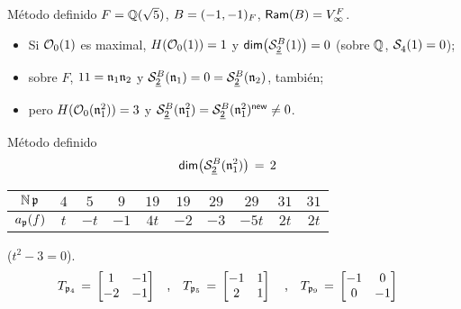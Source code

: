 \theoremstyle{remark}


\begin{frame}{M\'{e}todo definido}
	$F=\bb Q(\sqrt 5)$, $B=\quatalg[F]{-1,-1}$,
	$\Ram(B)=\lugares[\infty]{F}$.
	\begin{itemize}
		\item Si $\cal O_0(1)$ es maximal, $H(\cal O_0(1))=1$ y
			$\dim{\spitzH[B]2{1}}=0$ (sobre $\bb Q$,
			$\spitz4{1}=0$);
		\item sobre $F$, $11=\frak n_1\frak n_2$ y
			\begin{math}
				\spitzH[B]2{\frak n_1}=0=
					\spitzH[B]2{\frak n_2}
			\end{math}, tambi\'{e}n;
		\item pero $H(\cal O_0(\frak n_1^2))=3$ y
			\begin{math}
				\spitzH[B]2{\frak n_1^2}=
					\spitzH[B]2{\frak n_1^2}^\neue\not =0
			\end{math}.
	\end{itemize}
\end{frame}

\begin{frame}{M\'{e}todo definido}
	\begin{align*}
		\dim{\spitzH[B]2{\frak n_1^2}} & \,=\,2
	\end{align*}
	\begin{center}
		\begin{tabular}{c|ccccccccc}%
			$\idnorm\,\frak p$ & $4$ & $5$ & $9$ &
				$19$ & $19$ & $29$ & $29$ & $31$ & $31$ \\
			\hline
			$a_{\frak p}(f)$ & $t$ & $-t$ & $-1$ &
				$4t$ & $-2$ & $-3$ & $-5t$ & $2t$ & $2t$
		\end{tabular}
	\end{center}
	($t^2-3=0$).
	\begin{align*}
		T_{\frak p_4} \,=\,
			\begin{bmatrix}
				1 & -1 \\ -2 & -1
			\end{bmatrix} & \quad\text{,}\quad
		T_{\frak p_5} \,=\,
			\begin{bmatrix}
				-1 & 1 \\ 2 & 1
			\end{bmatrix} \quad\text{,}\quad
		T_{\frak p_9} \,=\,
			\begin{bmatrix}
				-1 & 0 \\ 0 & -1
			\end{bmatrix}
	\end{align*}
\end{frame}

